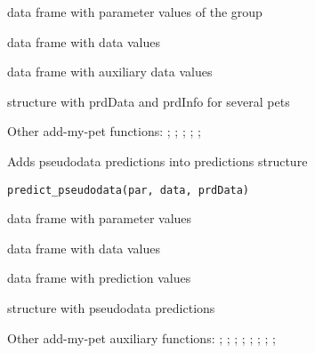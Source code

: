 \documentclass[a4paper]{book}
\begin{document}
%
\begin{Arguments}
\begin{ldescription}
\item[\code{parGrp}] data frame with parameter values of the group

\item[\code{data}] data frame with data values

\item[\code{auxData}] data frame with auxiliary data values
\end{ldescription}
\end{Arguments}
%
\begin{Value}
structure with prdData and prdInfo for several pets
\end{Value}
%
\begin{SeeAlso}\relax
Other add-my-pet functions: ;
; ;
; ;
\end{SeeAlso}
%
\begin{Description}\relax
Adds pseudodata predictions into predictions structure
\end{Description}
%
\begin{Usage}
\begin{verbatim}
predict_pseudodata(par, data, prdData)
\end{verbatim}
\end{Usage}
%
\begin{Arguments}
\begin{ldescription}
\item[\code{par}] data frame with parameter values

\item[\code{data}] data frame with data values

\item[\code{prdData}] data frame with prediction values
\end{ldescription}
\end{Arguments}
%
\begin{Value}
structure with pseudodata predictions
\end{Value}
%
\begin{SeeAlso}\relax
Other add-my-pet auxiliary functions: ;
; ;
; ;
; ;
; 
\end{SeeAlso}
\end{document}
